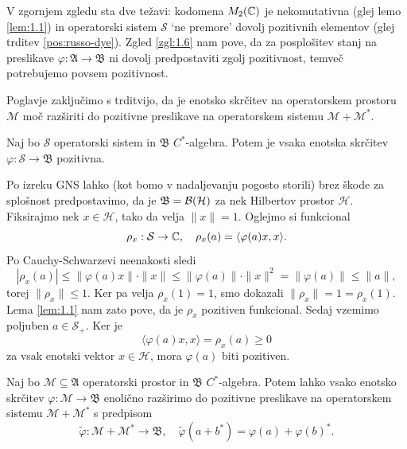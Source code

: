 \begin{opomba}
    V zgornjem zgledu sta dve težavi: kodomena $M_2 (\mathbb C)$ je nekomutativna (glej lemo \ref{lem:1.1})
    in operatorski sistem $\mathcal{S}$ `ne premore' dovolj pozitivnih elementov (glej trditev \ref{pos:russo-dye}).
    Zgled \ref{zgl:1.6} nam pove, da za posplošitev stanj na preslikave $\varphi: \mathfrak{A} \to \mathfrak{B}$
    ni dovolj predpostaviti zgolj pozitivnost, temveč potrebujemo povsem pozitivnost. 
\end{opomba}

Poglavje zaključimo s trditvijo, da je enotsko skrčitev na operatorskem prostoru $\mathcal{M}$
moč razširiti do pozitivne preslikave na operatorskem sistemu $\mathcal{M} + \mathcal{M}^*$.

\begin{trditev}
    Naj bo $\mathcal{S}$ operatorski sistem in $\mathfrak{B}$ $C^*$-algebra.
    Potem je vsaka enotska skrčitev $\varphi: \mathcal{S} \to \mathfrak{B}$ pozitivna.
\end{trditev}

\begin{dokaz}
    Po izreku GNS lahko (kot bomo v nadaljevanju pogosto storili) 
    brez škode za splošnost predpostavimo, da je $\mathfrak{B} = \operatorname{\mathcal{B} (\mathcal{H})}$ 
    za nek Hilbertov prostor $\mathcal{H}$.
    Fiksirajmo nek $x \in \mathcal{H}$, tako da velja $\| x\| = 1$.
    Oglejmo si funkcional
    $$\rho_x: \mathcal{S} \to \mathbb C,\quad \rho_x (a) = \langle \varphi(a) x, x \rangle.$$
    Po Cauchy-Schwarzevi neenakosti sledi
    $$|\rho_x (a)| \leq \| \varphi(a) x \| \cdot \| x\| \leq \| \varphi(a)\| \cdot \| x\|^2 = \|\varphi(a)\| \leq \| a\|,$$
    torej $\| \rho_x \| \leq 1$. Ker pa velja $\rho_x (1) = 1$, smo dokazali $\| \rho_x \| = 1 = \rho_x(1)$.
    Lema \ref{lem:1.1} nam zato pove, da je $\rho_x$ pozitiven funkcional.
    Sedaj vzemimo poljuben $a \in \mathcal{S}_+$. 
    Ker je
    $$\langle \varphi(a) x, x \rangle = \rho_x (a) \geq 0$$
    za vsak enotski vektor $x \in \mathcal{H}$, 
    mora $\varphi (a)$ biti pozitiven.
\end{dokaz}

\begin{trditev}
    Naj bo $\mathcal{M} \subseteq \mathfrak{A}$ operatorski prostor in $\mathfrak{B}$ $C^*$-algebra. 
    Potem lahko vsako enotsko skrčitev $\varphi: \mathcal{M} \to \mathfrak{B}$
    enolično razširimo do pozitivne preslikave na operatorskem sistemu $\mathcal{M} + \mathcal{M}^*$ s predpisom 
    $$\tilde{\varphi} : \mathcal{M} + \mathcal{M}^* \to \mathfrak{B},\quad \tilde{\varphi} (a + b^*) = \varphi(a) + \varphi (b)^*.$$
\end{trditev}

